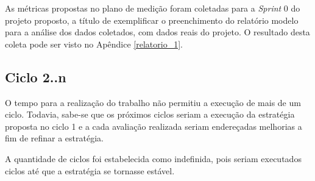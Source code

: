 	      
		As métricas propostas no plano de medição foram coletadas para a \textit{Sprint} 0 do
		projeto proposto, a título de exemplificar o preenchimento do relatório modelo para a análise
		dos dados coletados, com dados reais do projeto. O resultado desta coleta pode ser
		visto no Apêndice \ref{relatorio_1}.

\subsection{Ciclo 2..n}

	O tempo para a realização do trabalho não permitiu a execução de mais de um ciclo. Todavia,
	sabe-se que os próximos ciclos seriam a execução da estratégia proposta no ciclo 1 e a cada avaliação realizada
	seriam endereçadas melhorias a fim de refinar a estratégia.

	A quantidade de ciclos foi estabelecida como indefinida, pois seriam executados ciclos até que a estratégia 
	se tornasse estável.

